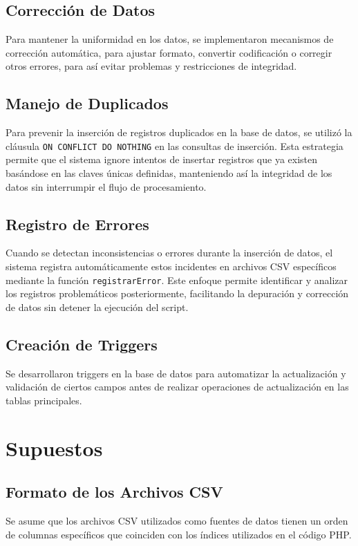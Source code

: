 \documentclass[12pt]{article}
\begin{document}
\subsection*{Corrección de Datos}
Para mantener la uniformidad en los datos, se implementaron mecanismos de corrección automática, para ajustar formato, convertir codificación o corregir otros errores, para así evitar problemas y restricciones de integridad.

\subsection*{Manejo de Duplicados}
Para prevenir la inserción de registros duplicados en la base de datos, se utilizó la cláusula \texttt{ON CONFLICT DO NOTHING} en las consultas de inserción. Esta estrategia permite que el sistema ignore intentos de insertar registros que ya existen basándose en las claves únicas definidas, manteniendo así la integridad de los datos sin interrumpir el flujo de procesamiento.

\subsection*{Registro de Errores}
Cuando se detectan inconsistencias o errores durante la inserción de datos, el sistema registra automáticamente estos incidentes en archivos CSV específicos mediante la función \texttt{registrarError}. Este enfoque permite identificar y analizar los registros problemáticos posteriormente, facilitando la depuración y corrección de datos sin detener la ejecución del script.

\subsection*{Creación de Triggers}
Se desarrollaron triggers en la base de datos para automatizar la actualización y validación de ciertos campos antes de realizar operaciones de actualización en las tablas principales.


\section*{Supuestos}

\subsection*{Formato de los Archivos CSV}
Se asume que los archivos CSV utilizados como fuentes de datos tienen un orden de columnas específicos que coinciden con los índices utilizados en el código PHP.
\end{document}
